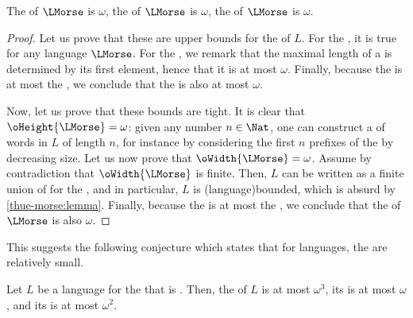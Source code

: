 \begin{lemma}
    \label{thue-morse-ordinal:lemma}
    The  of $\LMorse$ is $\omega$,
    the  of $\LMorse$ is $\omega$,
    the  of $\LMorse$ is $\omega$.
\end{lemma}
\begin{proof}
    Let us prove that these are upper bounds for the  of
    $L$. For the , it is true for any language $\LMorse$.
    For the , we remark that
    the maximal length of a  is determined by its first element,
    hence that it is at most $\omega$.
    Finally, because the  is at most the ,
    we conclude that the  is also at most $\omega$.

    Now, let us prove that these bounds are tight. It is clear that
    $\oHeight{\LMorse} = \omega$: given any number $n \in \Nat$, one can construct a
     of words in $L$ of length $n$, for instance by
    considering the first $n$ prefixes of the  by
    decreasing size.
    Let us now prove that $\oWidth{\LMorse} = \omega$. Assume by contradiction that
    $\oWidth{\LMorse}$ is finite. Then, $L$ can be written as a finite union of
     for the , and in particular, $L$ is
    \kl(language){bounded}, which is absurd by \cref{thue-morse:lemma}.
    Finally, because the  is at most the , we conclude that the  of $\LMorse$ is also $\omega$.
\end{proof}

This suggests the following conjecture which states that for  languages, the  are relatively small.

\begin{conjecture}
    \label{small-ordinal-invariants:conj}
    Let $L$ be a  language for the 
    that is .
    Then, the  of $L$ is at most $\omega^3$,
    its  is at most $\omega$,
    and its  is at most $\omega^2$.
\end{conjecture}
